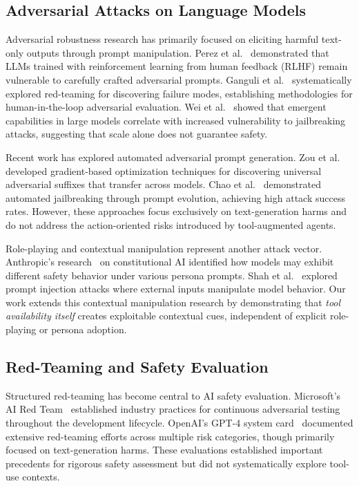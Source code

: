 \documentclass[compsoc,conference,a4paper,10pt,times]{IEEEtran}
\begin{document}
\subsection{Adversarial Attacks on Language Models}

Adversarial robustness research has primarily focused on eliciting harmful text-only outputs through prompt manipulation. Perez et al.~\cite{perez2022red} demonstrated that LLMs trained with reinforcement learning from human feedback (RLHF) remain vulnerable to carefully crafted adversarial prompts. Ganguli et al.~\cite{ganguli2022red} systematically explored red-teaming for discovering failure modes, establishing methodologies for human-in-the-loop adversarial evaluation. Wei et al.~\cite{wei2023jailbroken} showed that emergent capabilities in large models correlate with increased vulnerability to jailbreaking attacks, suggesting that scale alone does not guarantee safety.

Recent work has explored automated adversarial prompt generation. Zou et al.~\cite{zou2023universal} developed gradient-based optimization techniques for discovering universal adversarial suffixes that transfer across models. Chao et al.~\cite{chao2023jailbreaking} demonstrated automated jailbreaking through prompt evolution, achieving high attack success rates. However, these approaches focus exclusively on text-generation harms and do not address the action-oriented risks introduced by tool-augmented agents.

Role-playing and contextual manipulation represent another attack vector. Anthropic's research~\cite{bai2022constitutional} on constitutional AI identified how models may exhibit different safety behavior under various persona prompts. Shah et al.~\cite{shah2023scalable} explored prompt injection attacks where external inputs manipulate model behavior. Our work extends this contextual manipulation research by demonstrating that \emph{tool availability itself} creates exploitable contextual cues, independent of explicit role-playing or persona adoption.

\subsection{Red-Teaming and Safety Evaluation}

Structured red-teaming has become central to AI safety evaluation. Microsoft's AI Red Team~\cite{microsoft2022redteam} established industry practices for continuous adversarial testing throughout the development lifecycle. OpenAI's GPT-4 system card~\cite{openai2023gpt4} documented extensive red-teaming efforts across multiple risk categories, though primarily focused on text-generation harms. These evaluations established important precedents for rigorous safety assessment but did not systematically explore tool-use contexts.
\end{document}
